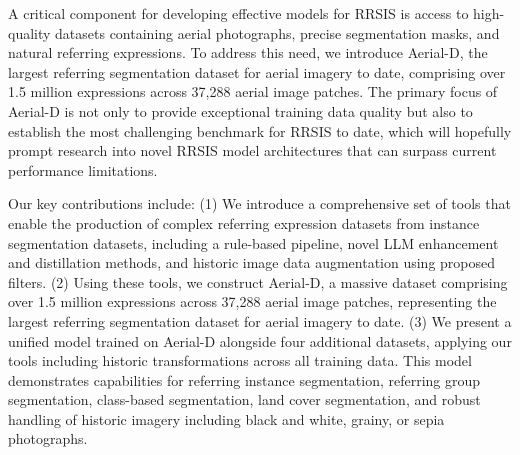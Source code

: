 A critical component for developing effective models for RRSIS is access to high-quality datasets containing aerial photographs, precise segmentation masks, and natural referring expressions. To address this need, we introduce Aerial-D, the largest referring segmentation dataset for aerial imagery to date, comprising over 1.5 million expressions across 37,288 aerial image patches. The primary focus of Aerial-D is not only to provide exceptional training data quality but also to establish the most challenging benchmark for RRSIS to date, which will hopefully prompt research into novel RRSIS model architectures that can surpass current performance limitations.

Our key contributions include: (1) We introduce a comprehensive set of tools that enable the production of complex referring expression datasets from instance segmentation datasets, including a rule-based pipeline, novel LLM enhancement and distillation methods, and historic image data augmentation using proposed filters. (2) Using these tools, we construct Aerial-D, a massive dataset comprising over 1.5 million expressions across 37,288 aerial image patches, representing the largest referring segmentation dataset for aerial imagery to date. (3) We present a unified model trained on Aerial-D alongside four additional datasets, applying our tools including historic transformations across all training data. This model demonstrates capabilities for referring instance segmentation, referring group segmentation, class-based segmentation, land cover segmentation, and robust handling of historic imagery including black and white, grainy, or sepia photographs.

